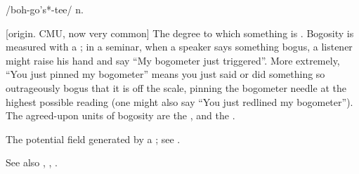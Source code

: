  /boh-go's*-tee/ n.

\begin{inparaenum}
\item {[}origin. CMU, now very common] The degree to which something is
    . Bogosity is measured with a ; in a
    seminar, when a speaker says something bogus, a listener might raise his
    hand and say ``My bogometer just triggered''. More extremely, ``You just
    pinned my bogometer'' means you just said or did something so outrageously
    bogus that it is off the scale, pinning the bogometer needle at the highest
    possible reading (one might also say ``You just redlined my bogometer'').
    The agreed-upon units of bogosity are the , and the
    .
\item The potential field generated by a ; see
    .
\end{inparaenum}
See also , , .

